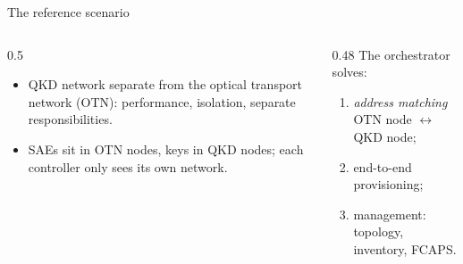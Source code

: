 \documentclass[10pt]{beamer}
\begin{document}
\begin{frame}{The reference scenario}
  \vspace{-1ex}
  \vspace{-1.5ex}
  \small
  \begin{columns}[T]
    \begin{column}{0.5\textwidth}
      \begin{itemize}
        \item QKD network separate from the optical transport network
              (OTN): performance, isolation, separate responsibilities.
        \item \alert{SAEs} sit in OTN nodes, \alert{keys} in QKD nodes;
              each controller only sees its own network.
      \end{itemize}
    \end{column}
    \begin{column}{0.48\textwidth}
      The orchestrator solves:
      \begin{enumerate}
        \item \emph{address matching} OTN node $\leftrightarrow$ QKD node;
        \item end-to-end provisioning;
        \item management: topology, inventory, FCAPS.
      \end{enumerate}
    \end{column}
  \end{columns}
\end{frame}
\end{document}
